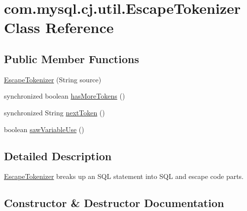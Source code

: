 \hypertarget{classcom_1_1mysql_1_1cj_1_1util_1_1_escape_tokenizer}{}\section{com.\+mysql.\+cj.\+util.\+Escape\+Tokenizer Class Reference}
\label{classcom_1_1mysql_1_1cj_1_1util_1_1_escape_tokenizer}
\subsection*{Public Member Functions}
\begin{DoxyCompactItemize}
\item 
\mbox{\hyperlink{classcom_1_1mysql_1_1cj_1_1util_1_1_escape_tokenizer_a013833659a8c808830fca0b87c685eb2}{Escape\+Tokenizer}} (String source)
\item 
synchronized boolean \mbox{\hyperlink{classcom_1_1mysql_1_1cj_1_1util_1_1_escape_tokenizer_a3a4646a7210f61efc6447864bd3480ca}{has\+More\+Tokens}} ()
\item 
synchronized String \mbox{\hyperlink{classcom_1_1mysql_1_1cj_1_1util_1_1_escape_tokenizer_a7a5f75e02ae63689a4c0d7a7f348b57d}{next\+Token}} ()
\item 
boolean \mbox{\hyperlink{classcom_1_1mysql_1_1cj_1_1util_1_1_escape_tokenizer_aaccac986d9952cb8c00f2f0d06271022}{saw\+Variable\+Use}} ()
\end{DoxyCompactItemize}


\subsection{Detailed Description}
\mbox{\hyperlink{classcom_1_1mysql_1_1cj_1_1util_1_1_escape_tokenizer}{Escape\+Tokenizer}} breaks up an S\+QL statement into S\+QL and escape code parts. 

\subsection{Constructor \& Destructor Documentation}
\mbox{\label{classcom_1_1mysql_1_1cj_1_1util_1_1_escape_tokenizer_a013833659a8c808830fca0b87c685eb2}} 
